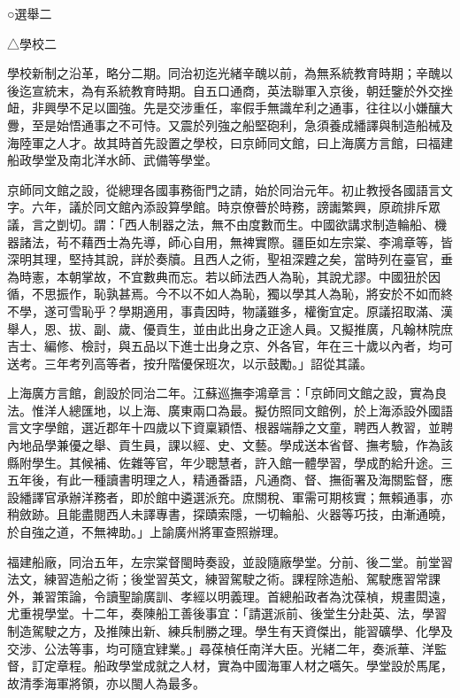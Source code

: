 
\begin{pinyinscope}
○選舉二

△學校二

學校新制之沿革，略分二期。同治初迄光緒辛醜以前，為無系統教育時期；辛醜以後迄宣統末，為有系統教育時期。自五口通商，英法聯軍入京後，朝廷鑒於外交挫衄，非興學不足以圖強。先是交涉重任，率假手無識牟利之通事，往往以小嫌釀大釁，至是始悟通事之不可恃。又震於列強之船堅砲利，急須養成繙譯與制造船械及海陸軍之人才。故其時首先設置之學校，曰京師同文館，曰上海廣方言館，曰福建船政學堂及南北洋水師、武備等學堂。

京師同文館之設，從總理各國事務衙門之請，始於同治元年。初止教授各國語言文字。六年，議於同文館內添設算學館。時京僚瞢於時務，謗讟繁興，原疏排斥眾議，言之剴切。謂：「西人制器之法，無不由度數而生。中國欲講求制造輪船、機器諸法，茍不藉西士為先導，師心自用，無裨實際。疆臣如左宗棠、李鴻章等，皆深明其理，堅持其說，詳於奏牘。且西人之術，聖祖深韙之矣，當時列在臺官，垂為時憲，本朝掌故，不宜數典而忘。若以師法西人為恥，其說尤謬。中國狃於因循，不思振作，恥孰甚焉。今不以不如人為恥，獨以學其人為恥，將安於不如而終不學，遂可雪恥乎？學期適用，事貴因時，物議雖多，權衡宜定。原議招取滿、漢舉人，恩、拔、副、歲、優貢生，並由此出身之正途人員。又擬推廣，凡翰林院庶吉士、編修、檢討，與五品以下進士出身之京、外各官，年在三十歲以內者，均可送考。三年考列高等者，按升階優保班次，以示鼓勵。」詔從其議。

上海廣方言館，創設於同治二年。江蘇巡撫李鴻章言：「京師同文館之設，實為良法。惟洋人總匯地，以上海、廣東兩口為最。擬仿照同文館例，於上海添設外國語言文字學館，選近郡年十四歲以下資稟穎悟、根器端靜之文童，聘西人教習，並聘內地品學兼優之舉、貢生員，課以經、史、文藝。學成送本省督、撫考驗，作為該縣附學生。其候補、佐雜等官，年少聰慧者，許入館一體學習，學成酌給升途。三五年後，有此一種讀書明理之人，精通番語，凡通商、督、撫衙署及海關監督，應設繙譯官承辦洋務者，即於館中遴選派充。庶關稅、軍需可期核實；無賴通事，亦稍斂跡。且能盡閱西人未譯專書，探賾索隱，一切輪船、火器等巧技，由漸通曉，於自強之道，不無裨助。」上諭廣州將軍查照辦理。

福建船廠，同治五年，左宗棠督閩時奏設，並設隨廠學堂。分前、後二堂。前堂習法文，練習造船之術；後堂習英文，練習駕駛之術。課程除造船、駕駛應習常課外，兼習策論，令讀聖諭廣訓、孝經以明義理。首總船政者為沈葆楨，規畫閎遠，尤重視學堂。十二年，奏陳船工善後事宜：「請選派前、後堂生分赴英、法，學習制造駕駛之方，及推陳出新、練兵制勝之理。學生有天資傑出，能習礦學、化學及交涉、公法等事，均可隨宜肄業。」尋葆楨任南洋大臣。光緒二年，奏派華、洋監督，訂定章程。船政學堂成就之人材，實為中國海軍人材之嚆矢。學堂設於馬尾，故清季海軍將領，亦以閩人為最多。


\end{pinyinscope}
